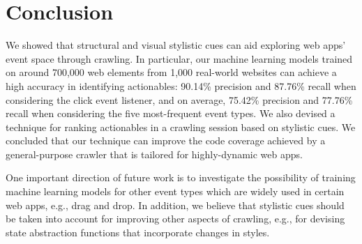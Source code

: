 
\section{Conclusion}
\label{sec:conclusion}

We showed that structural and visual stylistic cues
can aid exploring web apps' event space through crawling.
In particular, our machine learning models
trained on around 700,000 web elements from 1,000 real-world websites
can achieve a high accuracy
in identifying actionables:
90.14\% precision and 87.76\% recall 
when considering the click event listener,
and on average, 
75.42\% precision and 77.76\% recall 
when considering
the five most-frequent event types.
We also devised a technique for ranking actionables
in a crawling session based on stylistic cues.
We concluded that our technique can improve
the \js code coverage achieved by a general-purpose crawler that is tailored for highly-dynamic web apps.

One important direction of future work is to investigate the possibility of 
training machine learning models
for other event types
which are widely used in certain web apps,
e.g., drag and drop.
In addition, we believe that stylistic cues
should be taken into account for
improving other aspects of crawling,
e.g., 
for devising state abstraction functions
that incorporate changes in \css styles.






